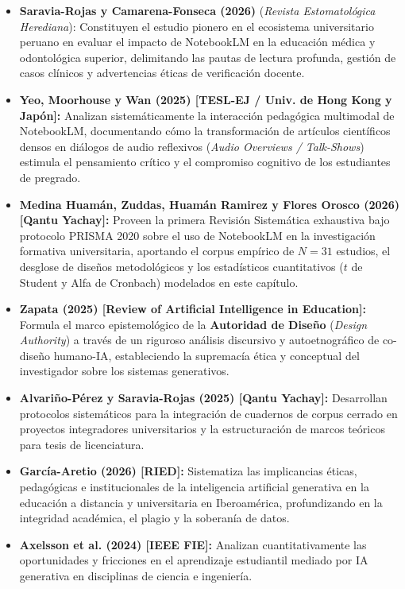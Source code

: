 \begin{itemize}[leftmargin=1.5em, itemsep=0.18em, topsep=0.15em]
    \item \textbf{Saravia-Rojas y Camarena-Fonseca (2026)} (\textit{Revista Estomatológica Herediana}): Constituyen el estudio pionero en el ecosistema universitario peruano en evaluar el impacto de NotebookLM en la educación médica y odontológica superior, delimitando las pautas de lectura profunda, gestión de casos clínicos y advertencias éticas de verificación docente.
    \item \textbf{Yeo, Moorhouse y Wan (2025) [TESL-EJ / Univ. de Hong Kong y Japón]:} Analizan sistemáticamente la interacción pedagógica multimodal de NotebookLM, documentando cómo la transformación de artículos científicos densos en diálogos de audio reflexivos (\textit{Audio Overviews / Talk-Shows}) estimula el pensamiento crítico y el compromiso cognitivo de los estudiantes de pregrado.
    \item \textbf{Medina Huamán, Zuddas, Huamán Ramirez y Flores Orosco (2026) [Qantu Yachay]:} Proveen la primera Revisión Sistemática exhaustiva bajo protocolo PRISMA 2020 sobre el uso de NotebookLM en la investigación formativa universitaria, aportando el corpus empírico de $N=31$ estudios, el desglose de diseños metodológicos y los estadísticos cuantitativos ($t$ de Student y Alfa de Cronbach) modelados en este capítulo.
    \item \textbf{Zapata (2025) [Review of Artificial Intelligence in Education]:} Formula el marco epistemológico de la \textbf{Autoridad de Diseño} (\textit{Design Authority}) a través de un riguroso análisis discursivo y autoetnográfico de co-diseño humano-IA, estableciendo la supremacía ética y conceptual del investigador sobre los sistemas generativos.
    \item \textbf{Alvariño-Pérez y Saravia-Rojas (2025) [Qantu Yachay]:} Desarrollan protocolos sistemáticos para la integración de cuadernos de corpus cerrado en proyectos integradores universitarios y la estructuración de marcos teóricos para tesis de licenciatura.
    \item \textbf{García-Aretio (2026) [RIED]:} Sistematiza las implicancias éticas, pedagógicas e institucionales de la inteligencia artificial generativa en la educación a distancia y universitaria en Iberoamérica, profundizando en la integridad académica, el plagio y la soberanía de datos.
    \item \textbf{Axelsson et al. (2024) [IEEE FIE]:} Analizan cuantitativamente las oportunidades y fricciones en el aprendizaje estudiantil mediado por IA generativa en disciplinas de ciencia e ingeniería.
\end{itemize}

